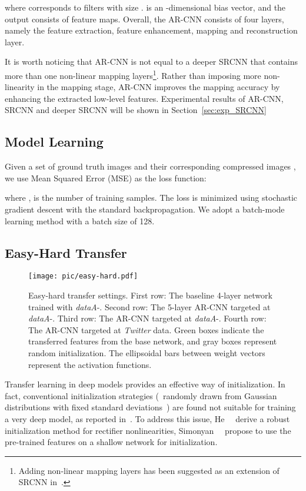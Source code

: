 \documentclass[10pt,twocolumn,letterpaper]{article}
\begin{document}
where  corresponds to  filters with size .  is an -dimensional bias vector, and the output  consists of  feature maps. Overall, the AR-CNN consists of four layers, namely the feature extraction, feature enhancement, mapping and reconstruction layer.

It is worth noticing that AR-CNN is not equal to a deeper SRCNN that contains more than one non-linear mapping layers\footnote{Adding non-linear mapping layers has been suggested as an extension of SRCNN in~\cite{Dong2014}.}. Rather than imposing more non-linearity in the mapping stage, AR-CNN improves the mapping accuracy by enhancing the extracted low-level features. Experimental results of AR-CNN, SRCNN and deeper SRCNN will be shown in Section~\ref{sec:exp_SRCNN}

\subsection{Model Learning}
\label{subsec:learning}
Given a set of ground truth images  and their corresponding compressed images , we use Mean Squared Error (MSE) as the loss function:

where ,  is the number of training samples. The loss is minimized using stochastic gradient descent with the standard backpropagation.
We adopt a batch-mode learning method with a batch size of 128.


\subsection{Easy-Hard Transfer}

\begin{figure}[t]\small
\begin{center}
\vskip -0.6cm
 \texttt{[image: pic/easy-hard.pdf]}
\vskip -3.9cm
\caption{Easy-hard transfer settings. First row: The baseline 4-layer network trained with \textit{dataA}-. Second row: The 5-layer AR-CNN targeted at \textit{dataA}-. Third row: The AR-CNN targeted at \textit{dataA}-. Fourth row: The AR-CNN targeted at \textit{Twitter} data. Green boxes indicate the transferred features from the base network, and gray boxes represent random initialization. The ellipsoidal bars between weight vectors represent the activation functions.}
\label{fig:Easy-hard1}
\vspace{-0.75cm}
\end{center}
\end{figure}

Transfer learning in deep models provides an effective way of initialization. In fact, conventional initialization strategies (\ie~randomly drawn from Gaussian distributions with fixed standard deviations~\cite{Krizhevsky2012}) are found not suitable for training a very deep model, as reported in~\cite{He2015}.
To address this issue, He~\etal~\cite{He2015} derive a robust initialization method for rectifier nonlinearities,  Simonyan~\etal~\cite{Simonyan2014} propose to use the pre-trained features on a shallow network for initialization.
\end{document}
